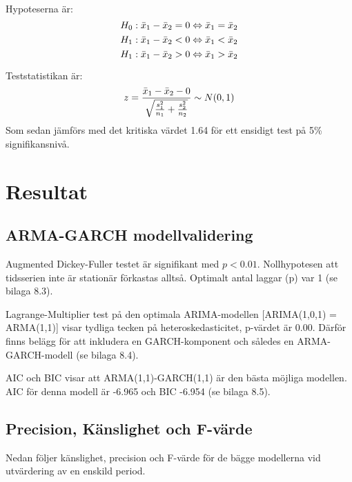 \documentclass[12pt]{article}
\begin{document}
Hypoteserna är:
\begin{equation*}
    H_0: \Bar{x}_1 - \Bar{x}_2 = 0 \Leftrightarrow \Bar{x}_1 = \Bar{x}_2
\end{equation*}
\begin{equation*}
    H_1: \Bar{x}_1 - \Bar{x}_2 < 0 \Leftrightarrow \Bar{x}_1 < \Bar{x}_2
\end{equation*}
\begin{equation}
    H_1: \Bar{x}_1 - \Bar{x}_2 > 0 \Leftrightarrow \Bar{x}_1 > \Bar{x}_2
\end{equation}

Teststatistikan är:
\begin{equation}
    z = \frac{\Bar{x}_1 - \Bar{x}_2 - 0}{\sqrt{\frac{s_1^2}{n_1}+\frac{s_2^2}{n_2}}} \sim N(0,1)
\end{equation}
Som sedan jämförs med det kritiska värdet 1.64 för ett ensidigt test på 5\% signifikansnivå. 


\newpage
\section{Resultat}
\subsection{ARMA-GARCH modellvalidering}
Augmented Dickey-Fuller testet är signifikant med \(p<0.01\). Nollhypotesen att tidsserien inte är stationär förkastas alltså. Optimalt antal laggar (p) var 1 (se bilaga 8.3).\par 
Lagrange-Multiplier test på den optimala ARIMA-modellen [ARIMA(1,0,1) = ARMA(1,1)] visar tydliga tecken på heteroskedasticitet, p-värdet är 0.00. Därför finns belägg för att inkludera en GARCH-komponent och således en ARMA-GARCH-modell (se bilaga 8.4). \par 
AIC och BIC visar att ARMA(1,1)-GARCH(1,1) är den bästa möjliga modellen. AIC för denna modell är -6.965 och BIC -6.954 (se bilaga 8.5).

\subsection{Precision, Känslighet och F-värde}
Nedan följer känslighet, precision och F-värde för de bägge modellerna vid utvärdering av en enskild period.
\end{document}
